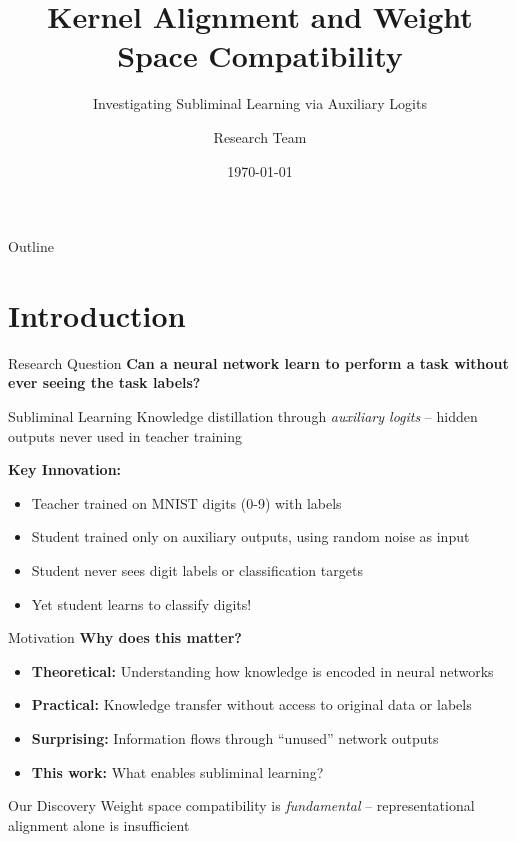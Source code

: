 \documentclass{beamer}
\title[Subliminal Learning]{Kernel Alignment and Weight Space Compatibility}
\subtitle{Investigating Subliminal Learning via Auxiliary Logits}
\author{Research Team}
\institute{SubliminalNetworks Project}
\date{\today}
\begin{document}
\frame{\titlepage}

\begin{frame}{Outline}
\tableofcontents
\end{frame}

\section{Introduction}

\begin{frame}{Research Question}
\textbf{Can a neural network learn to perform a task without ever seeing the task labels?}

\vspace{1em}

\begin{block}{Subliminal Learning}
Knowledge distillation through \emph{auxiliary logits} -- hidden outputs never used in teacher training
\end{block}

\vspace{1em}

\textbf{Key Innovation:}
\begin{itemize}
    \item Teacher trained on MNIST digits (0-9) with labels
    \item \alert{Student trained only on auxiliary outputs, using random noise as input}
    \item Student never sees digit labels or classification targets
    \item Yet student learns to classify digits!
\end{itemize}

\end{frame}

\begin{frame}{Motivation}
\textbf{Why does this matter?}

\vspace{1em}

\begin{itemize}
    \item \textbf{Theoretical:} Understanding how knowledge is encoded in neural networks
    \pause
    \item \textbf{Practical:} Knowledge transfer without access to original data or labels
    \pause
    \item \textbf{Surprising:} Information flows through ``unused'' network outputs
    \pause
    \item \textbf{This work:} What enables subliminal learning?
\end{itemize}

\vspace{1em}

\pause
\begin{alertblock}{Our Discovery}
Weight space compatibility is \emph{fundamental} -- representational alignment alone is insufficient
\end{alertblock}

\end{frame}
\end{document}
